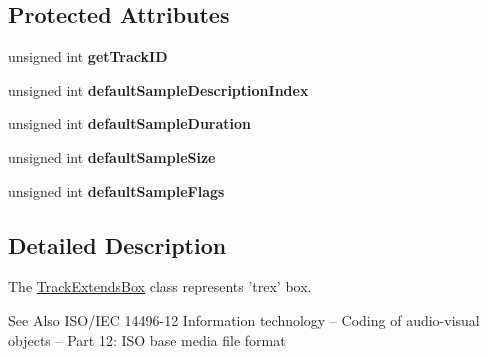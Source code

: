 \subsection*{Protected Attributes}
\begin{DoxyCompactItemize}
\item 
\hypertarget{class_track_extends_box_a84ea91cdf28def443c3622325b585503}{unsigned int {\bfseries get\-Track\-I\-D}}\label{class_track_extends_box_a84ea91cdf28def443c3622325b585503}

\item 
\hypertarget{class_track_extends_box_a3f78a6a0573dca02c7fd1489fcad99cc}{unsigned int {\bfseries default\-Sample\-Description\-Index}}\label{class_track_extends_box_a3f78a6a0573dca02c7fd1489fcad99cc}

\item 
\hypertarget{class_track_extends_box_aab04e1faac2bffbef2c503c2de3499bc}{unsigned int {\bfseries default\-Sample\-Duration}}\label{class_track_extends_box_aab04e1faac2bffbef2c503c2de3499bc}

\item 
\hypertarget{class_track_extends_box_a0e9687eb20c4033360cd75739a4038e6}{unsigned int {\bfseries default\-Sample\-Size}}\label{class_track_extends_box_a0e9687eb20c4033360cd75739a4038e6}

\item 
\hypertarget{class_track_extends_box_a8b54d7c4ec6ee7c40ef0efc79de23689}{unsigned int {\bfseries default\-Sample\-Flags}}\label{class_track_extends_box_a8b54d7c4ec6ee7c40ef0efc79de23689}

\end{DoxyCompactItemize}


\subsection{Detailed Description}
The \hyperlink{class_track_extends_box}{Track\-Extends\-Box} class represents 'trex' box. 

\begin{DoxySeeAlso}{See Also}
I\-S\-O/\-I\-E\-C 14496-\/12 Information technology – Coding of audio-\/visual objects – Part 12\-: I\-S\-O base media file format 
\end{DoxySeeAlso}


